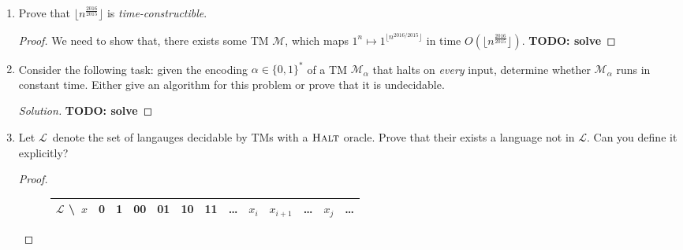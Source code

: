 \documentclass[usletter]{article}
\newcommand {\langset}[1]      {\ensuremath{\mathcal{#1}}}
\newcommand {\machine}[1]      {\ensuremath{\mathscr{#1}}}
\newcommand {\langfunc}        {\ensuremath{\mathfrak{L}}}
\newcommand {\namedlangset}[1] {\ensuremath{\textnormal{\textsc{#1}}}}
\newcommand {\family}[1]       {\ensuremath{\textnormal{\textsf{#1}}}}
\newcommand {\term}[1]      {\textit{#1}}
\newcommand{\todo}[1]{{\large \textbf{TODO: #1}}}
\newcommand {\langL}          {\langset{L}}
\newcommand {\machineM}       {\machine{M}}
\newcommand {\allstrings}     {\ensuremath{\{0,1\}^*}}
\begin{document}
\begin{enumerate}
\begin{proof}
    Thus, we have proved that
    $\langfunc(\machineM') =
     \langL_1 \cup (\langL_2 \cap \langL_3) \in \family{NP}$.
  \end{proof}

\begin{remark}
    In fact, we can always treat unions as disjunctions and intersections as
    conjunctions over machine outputs;
    to prove that \family{NP} is closed under these operations.
  \end{remark}

  \item Prove that $\lfloor n^{\frac{2016}{2015}} \rfloor$
        is \term{time-constructible}.
  \begin{proof}
    We need to show that, there exists some TM \machineM,
    which maps $1^n \mapsto 1^{\lfloor n^{2016/2015} \rfloor}$
    in time $O(\lfloor n^{\frac{2016}{2015}} \rfloor)$.
    \todo{solve}
  \end{proof}

  \item Consider the following task: given the encoding $\alpha \in \allstrings$
        of a TM $\machineM_\alpha$ that halts on \textit{every} input,
        determine whether $\machineM_\alpha$ runs in constant time.
        Either give an algorithm for this problem
        or prove that it is undecidable.
  \begin{proof}[Solution]
    \todo{solve}
  \end{proof}

  \item Let \langL\ denote the set of langauges decidable by TMs with a
        \namedlangset{Halt} oracle.
        Prove that their exists a language not in \langL.
        Can you define it explicitly?
  \begin{proof}
    \begin{figure}[h]
    \centering
    \def\arraystretch{1.8}\tabcolsep=6pt
    \begin{tabular}{|c||c|c|c|c|c|c|c|c|c|c|c|c|}
      \hline
      \textbf{\langL} \textbackslash~$x$
        & 0 & 1 & 00 & 01 & 10 & 11 & \ldots & $x_i$ & $x_{i+1}$ & \ldots
        & $x_j$ & \ldots \\\hline\hline


\end{tabular}
\end{figure}
\end{proof}
\end{enumerate}
\end{document}
